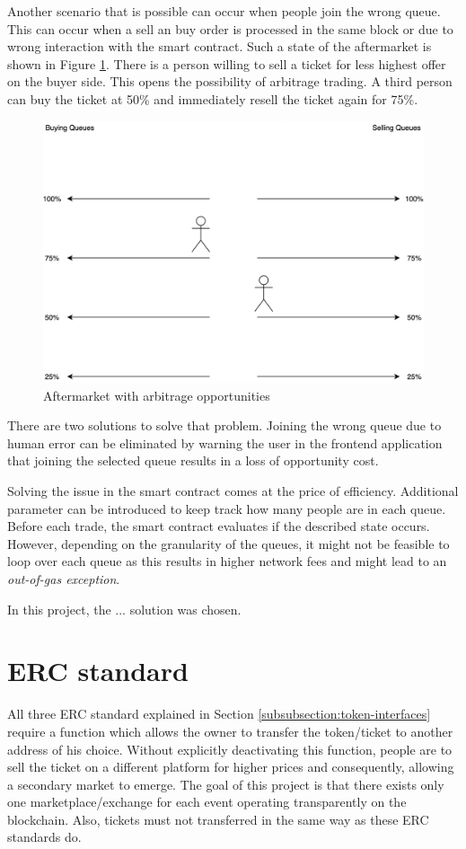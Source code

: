 Another scenario that is possible can occur when people join the wrong queue. This can occur when a sell an buy order is processed in the same block or due to wrong interaction with the smart contract. Such a state of the aftermarket is shown in Figure \ref{fig:aftermarket-arbitrage}. There is a person willing to sell a ticket for less highest offer on the buyer side. This opens the possibility of arbitrage trading. A third person can buy the ticket at 50\% and immediately resell the ticket again for 75\%. 

\begin{figure}[H]
    \centering
    \includegraphics[width=16cm]{figures/aftermarket-arbitrage.png}
    \caption{Aftermarket with arbitrage opportunities}
    \label{fig:aftermarket-arbitrage}
\end{figure}

There are two solutions to solve that problem. Joining the wrong queue due to human error can be eliminated by warning the user in the frontend application that joining the selected queue results in a loss of opportunity cost. 

Solving the issue in the smart contract comes at the price of efficiency. Additional parameter can be introduced to keep track how many people are in each queue. Before each trade, the smart contract evaluates if the described state occurs. However, depending on the granularity of the queues, it might not be feasible to loop over each queue as this results in higher network fees and might lead to an 
\textit{out-of-gas exception}.

In this project, the ... solution was chosen.

\section{ERC standard}
All three ERC standard explained in Section \ref{subsubsection:token-interfaces} require a function which allows the owner to transfer the token/ticket to another address of his choice. Without explicitly deactivating this function, people are to sell the ticket on a different platform for higher prices and consequently, allowing a secondary market to emerge. The goal of this project is that there exists only one marketplace/exchange for each event operating transparently on the blockchain. Also, tickets must not transferred in the same way as these ERC standards do.

